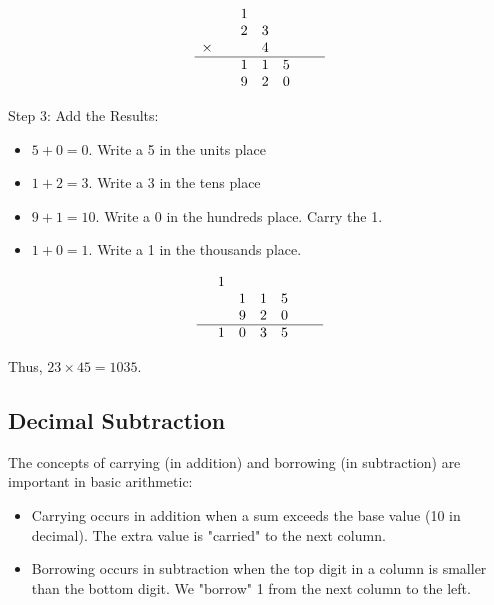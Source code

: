 \[
\begin{array}{rcccccc}
         &  & 1 &   &   & & \\ %
         &  & 2 & 3 &   & &\\ 
  \times &  &   & 4 &   & &\\ 
  \hline
        &   & 1 & 1 & 5 & & \\ 
        &   & 9 & 2 & 0 &
\end{array}
\]

\vspace{\baselineskip}\par
Step 3: Add the Results:
  \begin{itemize}
  \item \(5 + 0 = 0 \). Write a 5 in the units place
   \item \(1 + 2 = 3\). Write a 3 in the tens place
   \item \(9 + 1 = 10\). Write a 0 in the hundreds place. Carry the 1.
   \item \(1 + 0 = 1\). Write a 1 in the thousands place.
  \end{itemize}
\[
\begin{array}{rcccccc}
        & 1 &  &    &  &  & \\
        &   & 1 & 1 & 5 & & \\ 
        &   & 9 & 2 & 0 &   \\
        \hline
        & 1 & 0  & 3  & 5  &  
\end{array}
\]

Thus, \( 23 \times 45 = 1035 \).



\subsection{Decimal Subtraction}
The concepts of carrying (in addition) and borrowing (in subtraction) are important in basic arithmetic:

\begin{itemize}
    \item Carrying occurs in addition when a sum exceeds the base value (10 in decimal). The extra value is "carried" to the next column.
    \item Borrowing occurs in subtraction when the top digit in a column is smaller than the bottom digit. We "borrow" 1 from the next column to the left.
\end{itemize}

